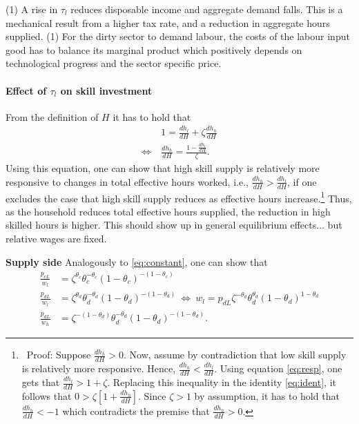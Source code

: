  
(1) A rise in $\tau_l$ reduces disposable income and aggregate demand falls. This is a mechanical result from a higher tax rate, and a reduction in aggregate hours supplied.  
(1) For the dirty sector to demand labour, the costs of the labour input good has to balance its marginal product which positively depends on technological progress and the sector specific price. 

\paragraph{Effect of $\tau_l$ on skill investment}
From the definition of $H$ it has to hold that 
\begin{align}
&1=\frac{dh_l}{dH}+\zeta \frac{dh_h}{dH}\label{eq:ident} \\
\Leftrightarrow\ & \frac{dh_h}{dH}=\frac{1-\frac{dh_l}{dH}}{\zeta}.\label{eq:resp}
\end{align}
Using this equation, one can show that high skill supply is relatively more responsive to changes in total effective hours worked, i.e.,  $\frac{dh_h}{dH}>\frac{dh_l}{dH}$, if one excludes the case that high skill supply reduces as effective hours increase.\footnote{\ Proof: Suppose   $\frac{dh_h}{dH}>0$. Now, assume by contradiction that low skill supply is relatively more responsive. Hence, $\frac{dh_h}{dH}<\frac{dh_l}{dH}$. Using equation \ref{eq:resp}, one gets that $\frac{dh_l}{dH}>1+\zeta$. Replacing this inequality in the identity \ref{eq:ident}, it follows that $0>\zeta[1+\frac{dh_h}{dH}]$. Since $\zeta>1$ by assumption, it has to hold that $\frac{dh_h}{dH}<-1$ which contradicts the premise that $\frac{dh_h}{dH}>0$. } Thus, as the household reduces total effective hours supplied, the reduction in high skilled hours is higher.  This should show up in general equilibrium effects... but relative wages are fixed. 


\textbf{Supply side}
Analogously to \ref{eq:constant}, one can show that
\begin{align*}
\frac{p_{cL}}{w_l}&=\zeta^{\theta_c}\theta_c^{-\theta_c}(1-\theta_c)^{-(1-\theta_c)}\\
\frac{p_{dL}}{w_l}&=\zeta^{\theta_d}\theta_d^{-\theta_d}(1-\theta_d)^{-(1-\theta_d)}\ \Leftrightarrow\ w_l= p_{dL}\zeta^{-\theta_d}\theta_d^{\theta_d}(1-\theta_d)^{1-\theta_d}\\
\frac{p_{dL}}{w_h}&=\zeta^{-(1-\theta_d)}\theta_d^{-\theta_d}(1-\theta_d)^{-(1-\theta_d)}.
\end{align*}

